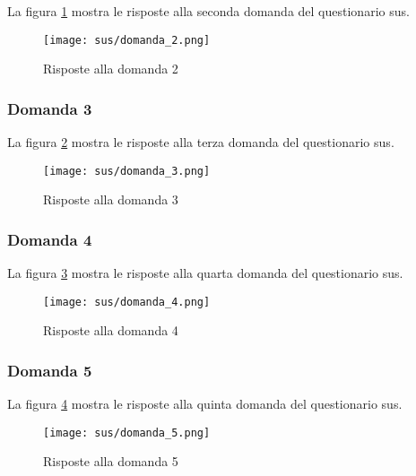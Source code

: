 \vspace{5pt}
\begin{minipage}{\textwidth}
  \noindent La figura \ref{fig:sus_q2} mostra le risposte alla seconda domanda del questionario \gls{sus}.
  \begin{figure}[H]
    \centering
    \texttt{[image: sus/domanda\_2.png]}
    \caption{Risposte alla domanda 2}
    \label{fig:sus_q2}
  \end{figure}
\end{minipage}

\subsubsection*{Domanda 3}

\vspace{5pt}
\begin{minipage}{\textwidth}
  \noindent La figura \ref{fig:sus_q3} mostra le risposte alla terza domanda del questionario \gls{sus}.
  \begin{figure}[H]
    \centering
    \texttt{[image: sus/domanda\_3.png]}
    \caption{Risposte alla domanda 3}
    \label{fig:sus_q3}
  \end{figure}
\end{minipage}

\subsubsection*{Domanda 4}

\vspace{5pt}
\begin{minipage}{\textwidth}
  \noindent La figura \ref{fig:sus_q4} mostra le risposte alla quarta domanda del questionario \gls{sus}.
  \begin{figure}[H]
    \centering
    \texttt{[image: sus/domanda\_4.png]}
    \caption{Risposte alla domanda 4}
    \label{fig:sus_q4}
  \end{figure}
\end{minipage}

\subsubsection*{Domanda 5}

\vspace{5pt}
\begin{minipage}{\textwidth}
  \noindent La figura \ref{fig:sus_q5} mostra le risposte alla quinta domanda del questionario \gls{sus}.
  \begin{figure}[H]
    \centering
    \texttt{[image: sus/domanda\_5.png]}
    \caption{Risposte alla domanda 5}
    \label{fig:sus_q5}
  \end{figure}
\end{minipage}


